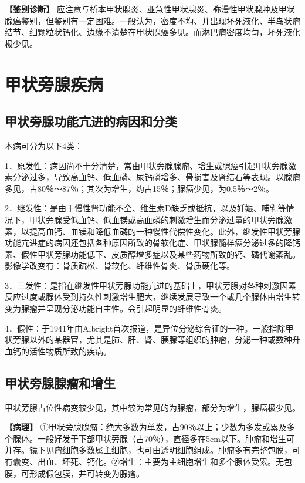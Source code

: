 \textbf{【鉴别诊断】}
应注意与桥本甲状腺炎、亚急性甲状腺炎、弥漫性甲状腺肿及甲状腺癌鉴别，但鉴别有一定困难。一般认为，密度不均、并出现坏死液化、半岛状瘤结节、细颗粒状钙化、边缘不清楚在甲状腺癌多见。而淋巴瘤密度均匀，坏死液化极少见。

\section{甲状旁腺疾病}

\subsection{甲状旁腺功能亢进的病因和分类}

本病可分为以下4类：

1．原发性：病因尚不十分清楚，常由甲状旁腺腺瘤、增生或腺癌引起甲状旁腺激素分泌过多，导致高血钙、低血磷、尿钙磷增多、骨损害及肾结石等表现。以腺瘤多见，占80％～87％；其次为增生，约占15％；腺癌少见，为0.5％～2％。

2．继发性：是由于慢性肾功能不全、维生素D缺乏或抵抗，以及妊娠、哺乳等情况下，甲状旁腺受低血钙、低血镁或高血磷的刺激增生而分泌过量的甲状旁腺激素，以提高血钙、血镁和降低血磷的一种慢性代偿性变化。此外，继发性甲状旁腺功能亢进症的病因还包括各种原因所致的骨软化症、甲状腺髓样癌分泌过多的降钙素、假性甲状旁腺功能低下、皮质醇增多症以及某些药物所致的钙、磷代谢紊乱。影像学改变有：骨质疏松、骨软化、纤维性骨炎、骨质硬化等。

3．三发性：是指在继发性甲状旁腺功能亢进的基础上，甲状旁腺对各种刺激因素反应过度或腺体受到持久性刺激增生肥大，继续发展导致一个或几个腺体由增生转变为腺瘤并呈现分泌功能自主性。会引起明显的纤维性骨炎。

4．假性：于1941年由Albright首次报道，是异位分泌综合征的一种。一般指除甲状旁腺以外的某器官，尤其是肺、肝、肾、胰腺等组织的肿瘤，分泌一种或数种升血钙的活性物质所致的疾病。

\subsection{甲状旁腺腺瘤和增生}

甲状旁腺占位性病变较少见，其中较为常见的为腺瘤，部分为增生，腺癌极少见。

\textbf{【病理】}
①甲状旁腺腺瘤：绝大多数为单发，占90％以上；少数为多发或累及多个腺体。一般好发于下部甲状旁腺（占70％），直径多在5cm以下。肿瘤和增生可并存。镜下见瘤细胞多数属主细胞，也可由透明细胞组成。肿瘤多有完整包膜，可有囊变、出血、坏死、钙化。②增生：主要为主细胞增生和多个腺体受累。无包膜，可形成假包膜，并可转变为腺瘤。

